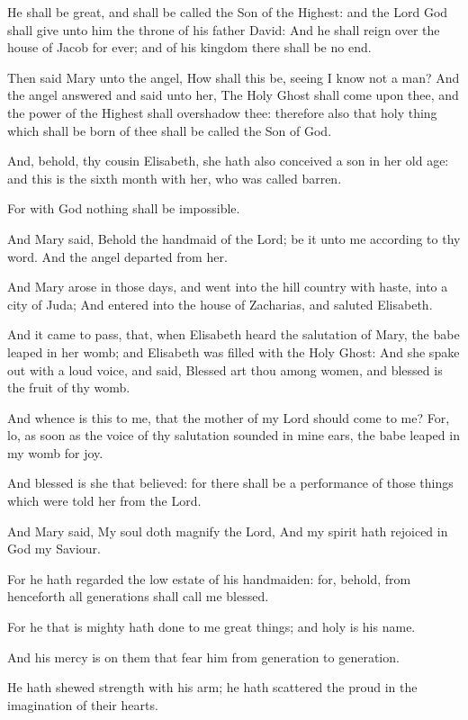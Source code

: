 \verse He shall be great, and shall be called the Son of the Highest: and the Lord God shall give unto him the throne of his father David: \verse And he shall reign over the house of Jacob for ever; and of his kingdom there shall be no end.

\verse Then said Mary unto the angel, How shall this be, seeing I know not a man?  \verse And the angel answered and said unto her, The Holy Ghost shall come upon thee, and the power of the Highest shall overshadow thee: therefore also that holy thing which shall be born of thee shall be called the Son of God.

\verse And, behold, thy cousin Elisabeth, she hath also conceived a son in her old age: and this is the sixth month with her, who was called barren.

\verse For with God nothing shall be impossible.

\verse And Mary said, Behold the handmaid of the Lord; be it unto me according to thy word. And the angel departed from her.

\verse And Mary arose in those days, and went into the hill country with haste, into a city of Juda; \verse And entered into the house of Zacharias, and saluted Elisabeth.

\verse And it came to pass, that, when Elisabeth heard the salutation of Mary, the babe leaped in her womb; and Elisabeth was filled with the Holy Ghost: \verse And she spake out with a loud voice, and said, Blessed art thou among women, and blessed is the fruit of thy womb.

\verse And whence is this to me, that the mother of my Lord should come to me?  \verse For, lo, as soon as the voice of thy salutation sounded in mine ears, the babe leaped in my womb for joy.

\verse And blessed is she that believed: for there shall be a performance of those things which were told her from the Lord.

\verse And Mary said, My soul doth magnify the Lord, \verse And my spirit hath rejoiced in God my Saviour.

\verse For he hath regarded the low estate of his handmaiden: for, behold, from henceforth all generations shall call me blessed.

\verse For he that is mighty hath done to me great things; and holy is his name.

\verse And his mercy is on them that fear him from generation to generation.

\verse He hath shewed strength with his arm; he hath scattered the proud in the imagination of their hearts.

